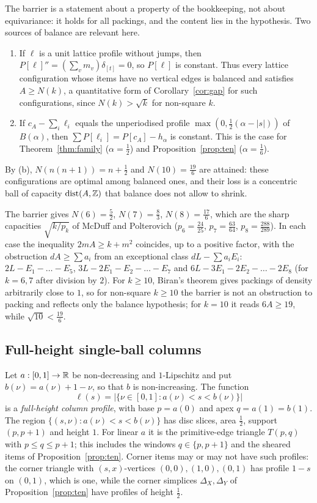 \documentclass[11pt]{amsart}
\begin{document}
The barrier is a statement about a property of the bookkeeping, not about equivariance: it holds for all packings,
and the content lies in the hypothesis. Two sources of balance are relevant here.
\begin{enumerate}[label=(\alph*),leftmargin=2em]
\item If $\ell$ is a unit lattice profile without jumps, then $P[\ell]''=(\sum_vm_v)\delta_{[t]}=0$, so $P[\ell]$ is
  constant. Thus every lattice configuration whose items have no vertical edges is balanced and satisfies
  $A\ge N(k)$, a quantitative form of Corollary~\ref{cor:gap} for such configurations, since $N(k)>\sqrt k$ for
  non-square $k$.
\item If $c_A-\sum_i\ell_i$ equals the unperiodised profile $\max(0,\frac12(\alpha-|s|))$ of $B(\alpha)$, then
  $\sum P[\ell_i]=P[c_A]-h_\alpha$ is constant. This is the case for Theorem~\ref{thm:family} ($\alpha=\frac12$) and
  Proposition~\ref{prop:ten} ($\alpha=\frac16$).
\end{enumerate}
By (b), $N(n(n+1))=n+\frac12$ and $N(10)=\frac{19}6$ are attained: these configurations are optimal among balanced
ones, and their loss is a concentric ball of capacity $\operatorname{dist}(A,\mathbb{Z})$ that balance does not allow to shrink.

\begin{remark}\label{rem:mp}
The barrier gives $N(6)=\frac52$, $N(7)=\frac83$, $N(8)=\frac{17}6$, which are the sharp capacities
$\sqrt{k/p_k}$ of McDuff and Polterovich \cite{McDuffPolterovich1994} ($p_6=\frac{24}{25}$, $p_7=\frac{63}{64}$,
$p_8=\frac{288}{289}$). In each case the inequality $2mA\ge k+m^2$ coincides, up to a positive factor, with the
obstruction $dA\ge\sum a_i$ from an exceptional class $dL-\sum a_iE_i$: $2L-E_1-\dots-E_5$, $3L-2E_1-E_2-\dots-E_7$
and $6L-3E_1-2E_2-\dots-2E_8$ (for $k=6,7$ after division by $2$). For $k\ge10$, Biran's theorem
\cite{Biran1997} gives packings of density arbitrarily close to $1$, so for non-square $k\ge10$ the barrier is not
an obstruction to packing and reflects only the balance hypothesis; for $k=10$ it reads $6A\ge19$, while
$\sqrt{10}<\frac{19}6$.
\end{remark}

\subsection{Full-height single-ball columns}\label{sec:eight}
Let $a:[0,1]\to\mathbb{R}$ be non-decreasing and $1$-Lipschitz and put $b(\nu)=a(\nu)+1-\nu$, so that $b$ is non-increasing.
The function
\[
\ell(s)=\bigl|\{\nu\in[0,1]:a(\nu)<s<b(\nu)\}\bigr|
\]
is a \emph{full-height column profile}, with base $p=a(0)$ and apex $q=a(1)=b(1)$. The region
$\{(s,\nu):a(\nu)<s<b(\nu)\}$ has disc slices, area $\frac12$, support $(p,p+1)$ and height $1$. For linear $a$ it is
the primitive-edge triangle $T(p,q)$ with $p\le q\le p+1$; this includes the windows $q\in\{p,p+1\}$ and the sheared items of
Proposition~\ref{prop:ten}. Corner items may or may not have such profiles: the corner triangle with
$(s,x)$-vertices $(0,0),(1,0),(0,1)$ has profile $1-s$ on $(0,1)$, which is one, while the corner simplices
$\Delta_X,\Delta_Y$ of Proposition~\ref{prop:ten} have profiles of height $\frac12$.
\end{document}
